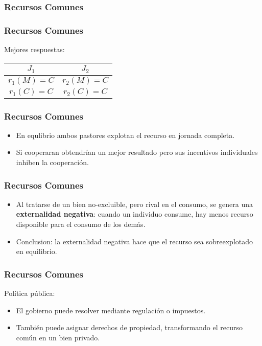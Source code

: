\documentclass[dvipsnames,table,leqno]{beamer}
\newcommand{\peq}[1]{{\scriptscriptstyle{#1}}}
\newcommand{\rp}[1]{\left(#1\right)}
\begin{document}
		\begin{frame}
			\frametitle{Recursos Comunes}
			\begin{table}[htbp!]
				\centering
				\resizebox{9cm}{!}{
					\begin{tabular}{|l|c|c|}\hline
						$J_\peq{1}$/$J_\peq{2}$&$M$&$C$ \\ [1ex] \hline
						$M$						 &$\rp{5,5}$&$\rp{1,\color{green}\underline{{\color{black}6}}\color{black}}$ \\ [1ex] \hline 
						$C$						 &$\rp{\color{blue}\underline{{\color{black}6}}\color{black},1}$&$\rp{\color{blue}\underline{{\color{black}3}}\color{black},\color{green}\underline{{\color{black}3}}\color{black}}$ \\ [1ex] \hline 
					\end{tabular}}
			\end{table}
		\end{frame}	

		\begin{frame}
			\frametitle{Recursos Comunes}
			Mejores respuestas:
			\begin{table}[htbp!]
				\centering
					\begin{tabular}{|c|c|}\hline
						$J_\peq{1}$				 &$J_\peq{2}$\\ [1ex] \hline
						$r_\peq{1}\rp{M}=C$&$r_\peq{2}\rp{M}=C$ \\ [1ex] 
						$r_\peq{1}\rp{C}=C$&$r_\peq{2}\rp{C}=C$ \\ [1ex] \hline 
					\end{tabular}%
			\end{table}
		\end{frame}	

		\begin{frame}
			\frametitle{Recursos Comunes}
			\begin{itemize}
				\item En equlibrio ambos pastores explotan el recurso en jornada completa.
				\item Si cooperaran obtendrían un mejor resultado pero sus incentivos individuales inhiben la cooperación. 
			\end{itemize}
		\end{frame}	

		\begin{frame}
			\frametitle{Recursos Comunes}
			\begin{itemize}
				\item Al tratarse de un bien no-excluible, pero rival en el consumo, se genera una \textbf{externalidad negativa}: cuando un individuo consume, hay menos recurso disponible para el consumo de los demás.
				\item Conclusion: la externalidad negativa hace que el recurso sea sobreexplotado en equilibrio.
			\end{itemize}
		\end{frame}

		\begin{frame}
			\frametitle{Recursos Comunes}
			Política pública:
			\begin{itemize}
				\item El gobierno puede resolver mediante regulación o impuestos.
				\item También puede asignar derechos de propiedad, transformando el recurso común en un bien privado.
			\end{itemize}
		\end{frame}
\end{document}
